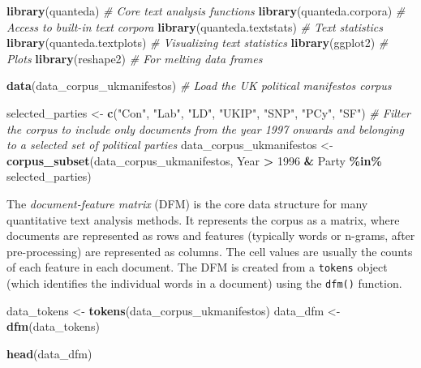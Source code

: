\documentclass[
]{book}
\newenvironment{Shaded}{\begin{snugshade}}{\end{snugshade}}
\newcommand{\CommentTok}[1]{\textcolor[rgb]{0.56,0.35,0.01}{\textit{#1}}}
\newcommand{\DecValTok}[1]{\textcolor[rgb]{0.00,0.00,0.81}{#1}}
\newcommand{\FunctionTok}[1]{\textcolor[rgb]{0.13,0.29,0.53}{\textbf{#1}}}
\newcommand{\NormalTok}[1]{#1}
\newcommand{\OtherTok}[1]{\textcolor[rgb]{0.56,0.35,0.01}{#1}}
\newcommand{\SpecialCharTok}[1]{\textcolor[rgb]{0.81,0.36,0.00}{\textbf{#1}}}
\newcommand{\StringTok}[1]{\textcolor[rgb]{0.31,0.60,0.02}{#1}}
\begin{document}
\begin{Shaded}
\begin{Highlighting}[]
\FunctionTok{library}\NormalTok{(quanteda)  }\CommentTok{\# Core text analysis functions}
\FunctionTok{library}\NormalTok{(quanteda.corpora)  }\CommentTok{\# Access to built{-}in text corpora}
\FunctionTok{library}\NormalTok{(quanteda.textstats)  }\CommentTok{\# Text statistics}
\FunctionTok{library}\NormalTok{(quanteda.textplots)  }\CommentTok{\# Visualizing text statistics}
\FunctionTok{library}\NormalTok{(ggplot2)  }\CommentTok{\# Plots}
\FunctionTok{library}\NormalTok{(reshape2)  }\CommentTok{\# For melting data frames }

\FunctionTok{data}\NormalTok{(data\_corpus\_ukmanifestos)  }\CommentTok{\# Load the UK political manifestos corpus}

\NormalTok{selected\_parties }\OtherTok{\textless{}{-}} \FunctionTok{c}\NormalTok{(}\StringTok{"Con"}\NormalTok{, }\StringTok{"Lab"}\NormalTok{, }\StringTok{"LD"}\NormalTok{, }\StringTok{"UKIP"}\NormalTok{, }\StringTok{"SNP"}\NormalTok{, }\StringTok{"PCy"}\NormalTok{, }\StringTok{"SF"}\NormalTok{)  }\CommentTok{\# Filter the corpus to include only documents from the year 1997 onwards and belonging to a selected set of political parties}
\NormalTok{data\_corpus\_ukmanifestos }\OtherTok{\textless{}{-}} \FunctionTok{corpus\_subset}\NormalTok{(data\_corpus\_ukmanifestos, Year }\SpecialCharTok{\textgreater{}} \DecValTok{1996} \SpecialCharTok{\&}
\NormalTok{    Party }\SpecialCharTok{\%in\%}\NormalTok{ selected\_parties)}
\end{Highlighting}
\end{Shaded}

The \emph{document-feature matrix} (DFM) is the core data structure for many quantitative text analysis methods. It represents the corpus as a matrix, where documents are represented as rows and features (typically words or n-grams, after pre-processing) are represented as columns. The cell values are usually the counts of each feature in each document. The DFM is created from a \texttt{tokens} object (which identifies the individual words in a document) using the \texttt{dfm()} function.

\begin{Shaded}
\begin{Highlighting}[]
\NormalTok{data\_tokens }\OtherTok{\textless{}{-}} \FunctionTok{tokens}\NormalTok{(data\_corpus\_ukmanifestos)}
\NormalTok{data\_dfm }\OtherTok{\textless{}{-}} \FunctionTok{dfm}\NormalTok{(data\_tokens)}

\FunctionTok{head}\NormalTok{(data\_dfm)}
\end{Highlighting}
\end{Shaded}
\end{document}

